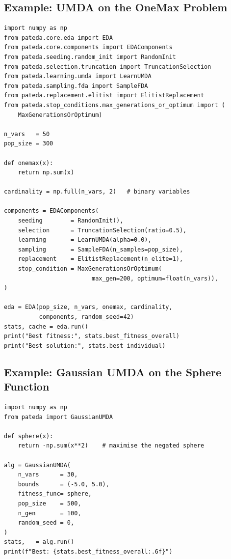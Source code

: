 \documentclass[a4paper,11pt]{article}
\begin{document}
\subsection{Example: UMDA on the OneMax Problem}
\label{ex:umda_onemax}

\begin{lstlisting}
import numpy as np
from pateda.core.eda import EDA
from pateda.core.components import EDAComponents
from pateda.seeding.random_init import RandomInit
from pateda.selection.truncation import TruncationSelection
from pateda.learning.umda import LearnUMDA
from pateda.sampling.fda import SampleFDA
from pateda.replacement.elitist import ElitistReplacement
from pateda.stop_conditions.max_generations_or_optimum import (
    MaxGenerationsOrOptimum)

n_vars   = 50
pop_size = 300

def onemax(x):
    return np.sum(x)

cardinality = np.full(n_vars, 2)   # binary variables

components = EDAComponents(
    seeding        = RandomInit(),
    selection      = TruncationSelection(ratio=0.5),
    learning       = LearnUMDA(alpha=0.0),
    sampling       = SampleFDA(n_samples=pop_size),
    replacement    = ElitistReplacement(n_elite=1),
    stop_condition = MaxGenerationsOrOptimum(
                         max_gen=200, optimum=float(n_vars)),
)

eda = EDA(pop_size, n_vars, onemax, cardinality,
          components, random_seed=42)
stats, cache = eda.run()
print("Best fitness:", stats.best_fitness_overall)
print("Best solution:", stats.best_individual)
\end{lstlisting}

\subsection{Example: Gaussian UMDA on the Sphere Function}
\label{ex:gumda_sphere}

\begin{lstlisting}
import numpy as np
from pateda import GaussianUMDA

def sphere(x):
    return -np.sum(x**2)    # maximise the negated sphere

alg = GaussianUMDA(
    n_vars      = 30,
    bounds      = (-5.0, 5.0),
    fitness_func= sphere,
    pop_size    = 500,
    n_gen       = 100,
    random_seed = 0,
)
stats, _ = alg.run()
print(f"Best: {stats.best_fitness_overall:.6f}")
\end{lstlisting}
\end{document}
